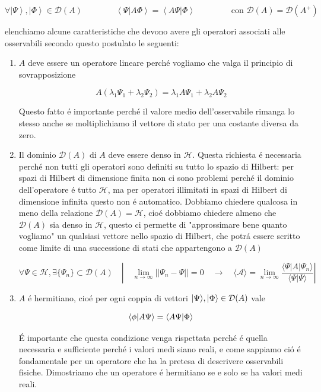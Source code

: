 $$\forall\left|\Psi\right\rangle,\left|\Phi\right\rangle\in\mathcal{D}(A) \qquad\qquad \left\langle\Psi|A\Phi\right\rangle=\left\langle A\Psi|\Phi\right\rangle \qquad\qquad \text{ con } {\mathcal{D}}(A)={\mathcal{D}}(A^{+})$$

elenchiamo alcune caratteristiche che devono avere gli operatori associati alle osservabili secondo questo postulato le seguenti:
\begin{enumerate}
	\item $A$ deve essere un operatore lineare perch\'e vogliamo che valga il principio di sovrapposizione
	
	$$A(\lambda_{1}\Psi_{1}+\lambda_{2}\Psi_{2})=\lambda_{1}A\Psi_{1}+\lambda_{2}A\Psi_{2}$$
	
	Questo fatto \'e importante perch\'e il valore medio dell'osservabile rimanga lo stesso anche se moltiplichiamo il vettore di stato per una costante diversa da zero.
	
	\item Il dominio $\mathcal{D}(A)$ di $A$ deve essere denso in $\mathcal{H}$. Questa richiesta \'e necessaria perch\'e non tutti gli operatori sono definiti su tutto lo spazio di Hilbert: per spazi di Hilbert di dimensione finita non ci sono problemi perch\'e il dominio dell'operatore \'e tutto $\mathcal{H}$, ma per operatori illimitati in spazi di Hilbert di dimensione infinita questo non \'e automatico. Dobbiamo chiedere qualcosa in meno della relazione $\mathcal{D}(A) = \mathcal{H}$, cio\'e dobbiamo chiedere almeno che $\mathcal{D}(A)$ sia denso in $\mathcal{H}$, questo ci permette di "approssimare bene quanto vogliamo" un qualsiasi vettore nello spazio di Hilbert, che potr\'a essere scritto come limite di una successione di stati che appartengono a $\mathcal{D}(A)$
	
	$$\forall\Psi\in\mathcal{H},\exists\{\Psi_{n}\}\subset\mathcal{D}(A)\quad\left|\quad\lim_{n\to\infty}||\Psi_{n}-\Psi||=0\quad\longrightarrow\quad\langle\mathcal{A}\rangle=\lim_{n\to\infty}\frac{\langle\Psi|A|\Psi_{n}\rangle}{\langle\Psi|\Psi\rangle}\right|$$
	
	\item $A$ \'e hermitiano, cio\'e per ogni coppia di vettori $\ket{\Psi}, \ket{\Phi} \in \mathcal{D}(A)$ vale
	
	$$\braket{\phi}{A\Psi} = \braket{A\Psi}{\Phi}$$
	
	\'E importante che questa condizione venga rispettata perch\'e \'e quella necessaria e sufficiente perch\'e i valori medi siano reali, e come sappiamo ci\'o \'e fondamentale per un operatore che ha la pretesa di descrivere osservabili fisiche. Dimostriamo che un operatore \'e hermitiano se e solo se ha valori medi reali.
	

\end{enumerate}
